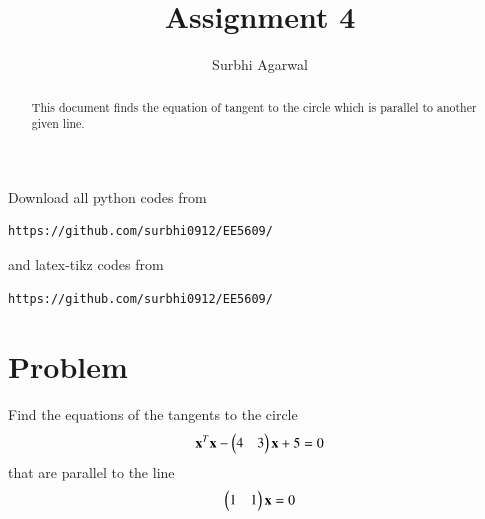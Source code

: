 \documentclass[journal,12pt,twocolumn]{IEEEtran}
\begin{document}
\let\StandardTheFigure\thefigure
\let\vec\mathbf

\renewcommand{\thefigure}{\theproblem}

\def\putbox#1#2#3{\makebox[0in][l]{\makebox[#1][l]{}\raisebox{\baselineskip}[0in][0in]{\raisebox{#2}[0in][0in]{#3}}}}
     \def\rightbox#1{\makebox[0in][r]{#1}}
     \def\centbox#1{\makebox[0in]{#1}}
     \def\topbox#1{\raisebox{-\baselineskip}[0in][0in]{#1}}
     \def\midbox#1{\raisebox{-0.5\baselineskip}[0in][0in]{#1}}
\vspace{3cm}

\title{Assignment 4}
\author{Surbhi Agarwal}

\maketitle

\newpage


\bigskip

\renewcommand{\thefigure}{\theenumi}
\renewcommand{\thetable}{\theenumi}

\begin{abstract}
This document finds the equation of tangent to the circle which is parallel to another given line.
\end{abstract}

Download all python codes from 
%
\begin{lstlisting}
https://github.com/surbhi0912/EE5609/
\end{lstlisting}
%
and latex-tikz codes from 
%
\begin{lstlisting}
https://github.com/surbhi0912/EE5609/
\end{lstlisting}
%
\section{Problem}
Find the equations of the tangents to the circle
\begin{align}\nonumber
    \vec{x}^T\vec{x} -\myvec{4 & 3}\vec{x}+5 = 0
\end{align}
that are parallel to the line
\begin{align}\nonumber
    \myvec{1 & 1}\vec{x} = 0
\end{align}
\end{document}
